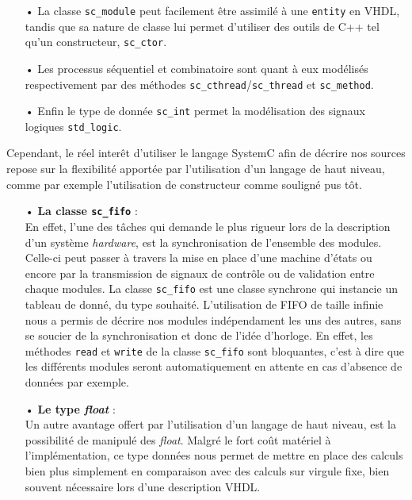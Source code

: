 \documentclass[a4paper,12pt]{article}
\begin{document}
\begin{itemize}
\item[•] La classe \texttt{sc\_module} peut facilement être assimilé à une \texttt{entity} en VHDL, tandis que sa nature de classe lui permet d'utiliser des outils de C++ tel qu'un constructeur, \texttt{sc\_ctor}.
\item[•] Les processus séquentiel et combinatoire sont quant à eux modélisés respectivement par des méthodes \texttt{sc\_cthread}/\texttt{sc\_thread} et \texttt{sc\_method}.
\item[•] Enfin le type de donnée \texttt{sc\_int} permet la modélisation des signaux logiques \texttt{std\_logic}.\\
\end{itemize}

Cependant, le réel interêt d'utiliser le langage SystemC afin de décrire nos sources repose sur la flexibilité apportée par l'utilisation d'un langage de haut niveau, comme par exemple l'utilisation de constructeur comme souligné pus tôt.

\begin{itemize}
\item[•] \textbf{La classe \texttt{sc\_fifo}} :\\
En effet, l'une des tâches qui demande le plus rigueur lors de la description d'un système \textit{hardware}, est la synchronisation de l'ensemble des modules. Celle-ci peut passer à travers la mise en place d'une machine d'états ou encore par la transmission de signaux de contrôle ou de validation entre chaque modules. La classe \texttt{sc\_fifo} est une classe synchrone qui instancie un tableau de donné, du type souhaité. L'utilisation de FIFO de taille infinie nous a permis de décrire nos modules indépendament les uns des autres, sans se soucier de la synchronisation et donc de l'idée d'horloge. En effet, les méthodes \texttt{read} et \texttt{write} de la classe \texttt{sc\_fifo} sont bloquantes, c'est à dire que les différents modules seront automatiquement en attente en cas d'absence de données par exemple.\\

\item[•] \textbf{Le type \textit{float}} :\\
Un autre avantage offert par l'utilisation d'un langage de haut niveau, est la possibilité de manipulé des \textit{float}. Malgré le fort coût matériel à l'implémentation, ce type données nous permet de mettre en place des calculs bien plus simplement en comparaison avec des calculs sur virgule fixe, bien souvent nécessaire lors d'une description VHDL.\\
\end{itemize}
\end{document}
